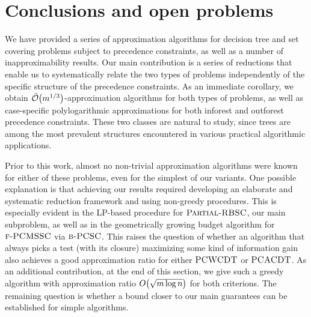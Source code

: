 \section{Conclusions and open problems}\label{sec:conclusions}

We have provided a series of approximation algorithms for decision tree and set covering problems subject to precedence constraints, as well as a number of inapproximability results. Our main contribution is a series of reductions that enable us to systematically relate the two types of problems independently of the specific structure of the precedence constraints. As an immediate corollary, we obtain $\tilde{\mathcal{O}}\mathopen{}\left( m^{1/3} \right)$-approximation algorithms for both types of problems, as well as case-specific polylogarithmic approximations for both inforest and outforest precedence constraints. These two classes are natural to study, since trees are among the most prevalent structures encountered in various practical algorithmic applications.

Prior to this work, almost no non-trivial approximation algorithms were known for either of these problems, even for the simplest of our variants. One possible explanation is that achieving our results required developing an elaborate and systematic reduction framework and using non-greedy procedures. This is especially evident in the LP-based procedure for $\textup{\textsc{Partial-RBSC}}$, our main subproblem, as well as in the geometrically growing budget algorithm for $\textup{\textsc{f-PCMSSC}}$ via $\textup{\textsc{b-PCSC}}$. This raises the question of whether an algorithm that always picks a test (with its closure) maximizing some kind of information gain also achieves a good approximation ratio for either $\textup{\textsc{PCWCDT}}$ or $\textup{\textsc{PCACDT}}$. As an additional contribution, at the end of this section, we give such a greedy algorithm with approximation ratio $O\mathopen{}\left( \sqrt{m\log n} \right)$ for both criterions. The remaining question is whether a bound closer to our main guarantees can be established for simple algorithms.

